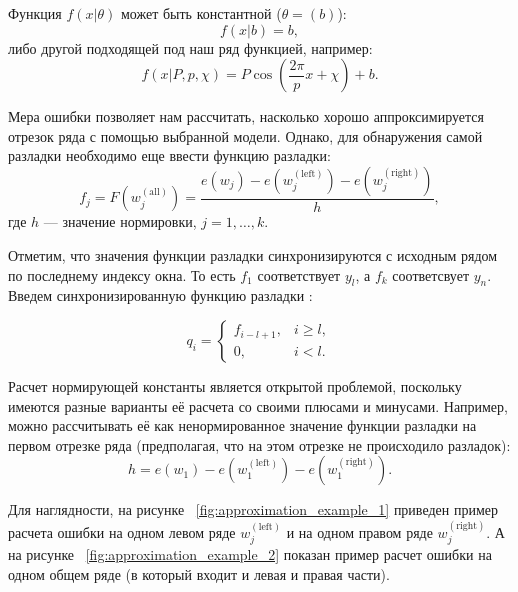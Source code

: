 \documentclass[%
12pt,
master,  %
natbib,      %
subf,        %
substylefile = spbu.rtx,
href,        %
colorlinks,  %
]{disser}
\begin{document}

Функция $f(x|\theta)$ может быть константной ($\theta = (b)$):
\begin{equation*}
f(x | b) = b,
\end{equation*}
либо другой подходящей под наш ряд функцией, например:
\begin{equation*}
f(x | P, p, \chi) = P\cos(\frac{2\pi}{p}x + \chi) + b. 
\end{equation*}

Мера ошибки позволяет нам рассчитать, насколько хорошо аппроксимируется отрезок ряда с помощью выбранной модели. Однако, для обнаружения самой разладки необходимо еще ввести функцию разладки:
\begin{equation*}
f_j = F(w_j^{\mathrm{(all)}} ) = \frac{e(w_j) - e(w_j^{\mathrm{(left)}}) - e(w_j^{\mathrm{(right)}})}{h}, 
\end{equation*}
где $h$ --- значение нормировки, $j = 1, \dots, k$.

Отметим, что значения функции разладки синхронизируются с исходным рядом по последнему индексу окна. То есть $f_1$ соответствует $y_l$, а $f_k $ соответсвует $y_n$. Введем синхронизированную функцию разладки :

\begin{equation*}
q_i =
	\begin{cases}
		f_{i-l+1}, & i \geq l, \\
		0, & i < l.
	\end{cases}
\end{equation*}

Расчет нормирующей константы является открытой проблемой, поскольку имеются разные варианты её расчета со своими плюсами и минусами.
Например, можно рассчитывать её как ненормированное значение функции разладки на первом отрезке ряда (предполагая, что на этом отрезке не происходило разладок):
\begin{equation*} 
h = e(w_1) - e(w_1^{\mathrm{(left)}}) - e(w_1^{\mathrm{(right)}}). 
\end{equation*}

Для наглядности, на рисунке ~\ref{fig:approximation_example_1} приведен пример расчета ошибки на одном левом ряде $ w_j^{\mathrm{(left)}} $ и на одном правом ряде $ w_j^{\mathrm{(right)}} $. А на рисунке ~\ref{fig:approximation_example_2} показан пример расчет ошибки на одном общем ряде (в который входит и левая и правая части).
\end{document}
